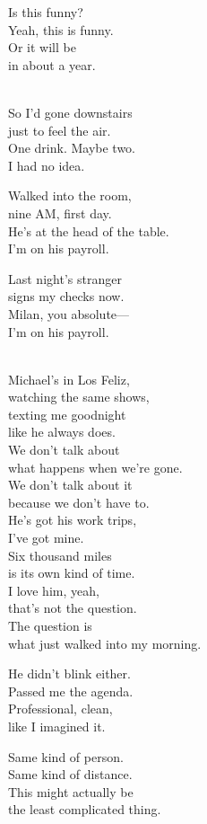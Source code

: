 \begin{lyrics}
Is this funny?\\
Yeah, this is funny.\\
Or it will be\\
in about a year.

\\
So I'd gone downstairs\\
just to feel the air.\\
One drink. %
Maybe two.\\
I had no idea.

Walked into the room,\\
nine AM, first day.\\
He's at the head of the table.\\
I'm on his payroll.

Last night's stranger\\
signs my checks now.\\
Milan, you absolute—\\
I'm on his payroll.

\\
Michael's in Los Feliz,\\
watching the same shows,\\
texting me goodnight\\
like he always does.\\
We don't talk about\\
what happens when we're gone.\\
We don't talk about it\\
because we don't have to.\\
He's got his work trips,\\
I've got mine.\\
Six thousand miles\\
is its own kind of time.\\
I love him, yeah,\\
that's not the question.\\
The question is\\
what just walked into my morning.

He didn't blink either.\\
Passed me the agenda.\\
Professional, clean,\\
like I imagined it.

Same kind of person.\\
Same kind of distance.\\
This might actually be\\
the least complicated thing.


\end{lyrics}
